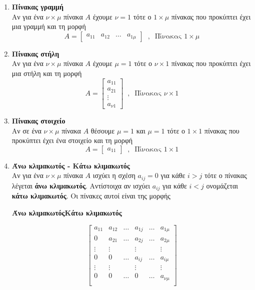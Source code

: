 \documentclass[twoside,10pt]{book}
\begin{document}
\begin{enumerate}[itemsep=0mm,label=\bf\arabic*.]
\item \textbf{Πίνακας γραμμή}\\
Αν για ένα $ \nu\times\mu $ πίνακα $ A $ έχουμε $ \nu=1 $ τότε ο $ 1\times\mu $ πίνακας που προκύπτει έχει μια γραμμή και τη μορφή 
\[ A=\begin{bmatrix}
a_{11} & a_{12} & \ldots & a_{1\mu}
\end{bmatrix}\;\;,\;\;\textrm{Πίνακας }1\times\mu \]
\item \textbf{Πίνακας στήλη}\\
Αν για ένα $ \nu\times\mu $ πίνακα $ A $ έχουμε $ \mu=1 $ τότε ο $ \nu\times1 $ πίνακας που προκύπτει έχει μια στήλη και τη μορφή 
\[ A=\begin{bmatrix}
a_{11} \\ a_{21} \\ \vdots \\ a_{\nu1}
\end{bmatrix}\;\;,\;\;\textrm{Πίνακας }\nu\times1 \]
\item \textbf{Πίνακας στοιχείο}\\
Αν σε ένα $ \nu\times\mu $ πίνακα $ A $ θέσουμε $ \mu=1 $ και $ \mu=1 $ τότε ο $ 1\times1 $ πίνακας που προκύπτει έχει ένα στοιχείο και τη μορφή \[ A=\begin{bmatrix}
a_{11}
\end{bmatrix}\;\;,\;\;\textrm{Πίνακας }1\times1 \]
\item \textbf{Άνω κλιμακωτός - Κάτω κλιμακωτός}\\
Αν για ένα $ \nu\times\mu $ πίνακα $ A $ ισχύει η σχέση $ a_{ij}=0 $ για κάθε $ i>j $ τότε ο πίνακας λέγεται \textbf{άνω κλιμακωτός}. Αντίστοιχα αν ισχύει $ a_{ij} $ για κάθε $ i<j $ ονομάζεται \textbf{κάτω κλιμακωτός}. Οι πίνακες αυτοί είναι της μορφής 
\begin{center}
\textbf{Άνω κλιμακωτός}\qquad\qquad\qquad\qquad\textbf{Κάτω κλιμακωτός}
\end{center}
\[ \begin{bmatrix}
a_{11} & a_{12} & \ldots & a_{1j} & \ldots &  a_{1\mu}\\
0 & a_{21} & \ldots & a_{2j} & \ldots &  a_{2\mu}\\
\vdots & \vdots &  & \vdots &  &  \vdots\\
0 & 0 & \ldots & a_{ij} & \ldots &  a_{i\mu}\\
\vdots & \vdots &  & \vdots &  & \vdots\\
0 & 0 & \ldots & 0 & \ldots &  a_{\nu\mu}\\

\end{bmatrix}\]
\end{enumerate}
\end{document}
